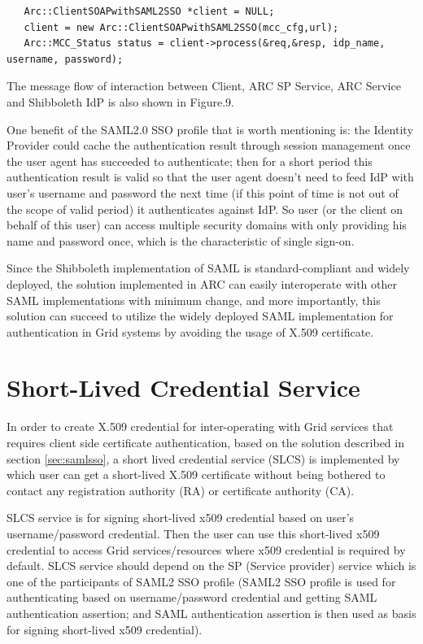 \documentclass{article}                            %
\begin{document}
\begin{verbatim}
   Arc::ClientSOAPwithSAML2SSO *client = NULL;
   client = new Arc::ClientSOAPwithSAML2SSO(mcc_cfg,url);
   Arc::MCC_Status status = client->process(&req,&resp, idp_name, username, password);
\end{verbatim}

    The message flow of interaction between Client, ARC SP Service, ARC Service and Shibboleth IdP is also shown in Figure.9.

  One benefit of the SAML2.0 SSO profile that is worth mentioning is: the Identity Provider could cache the authentication result through session management once the user agent has succeeded to authenticate; then for a short period this authentication result is valid so that the user agent doesn’t need to feed IdP with user’s username and password the next time (if this point of time is not out of the scope of valid period) it authenticates against IdP. So user (or the client on behalf of this user) can access multiple security  domains with only providing his name and password once, which is the characteristic of single sign-on.

    Since the Shibboleth implementation of SAML is standard-compliant and widely deployed, the solution implemented in ARC can easily interoperate with other SAML implementations with minimum change, and more importantly, this solution can succeed to utilize the widely deployed SAML implementation for authentication in Grid systems by avoiding the usage of X.509 certificate.




\section{Short-Lived Credential Service} %
\label{sec:slcs}
In order to create X.509 credential for inter-operating with Grid services that requires client side certificate authentication, based on the solution described in section \ref{sec:samlsso}, a short lived credential service (SLCS) is implemented by which user can get a short-lived X.509 certificate without being bothered to contact any registration authority (RA) or certificate authority (CA).

    SLCS service is for signing short-lived x509 credential based on user's username/password credential. Then the user can use this short-lived x509 credential to access Grid services/resources where x509 credential is required by default. SLCS service should depend on the SP (Service provider) service which is one of the participants of SAML2 SSO profile (SAML2 SSO profile is used for authenticating based on username/password credential and getting SAML authentication assertion; and SAML authentication assertion is then used as basis for signing short-lived x509 credential).
\end{document}
